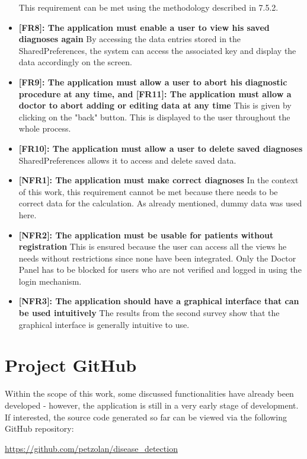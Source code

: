 \begin{itemize}
	\newline
	This requirement can be met using the methodology described in 7.5.2.
	\item \textbf{[FR8]: The application must enable a user to view his saved diagnoses again}
	\newline
	By accessing the data entries stored in the SharedPreferences, the system can access the associated key and display the data accordingly on the screen.
	\item \textbf{[FR9]: The application must allow a user to abort his diagnostic procedure at any time, and [FR11]: The application must allow a doctor to abort adding or editing data at any time}
	\newline
	This is given by clicking on the "back" button. This is displayed to the user throughout the whole process.
	\item \textbf{[FR10]: The application must allow a user to delete saved diagnoses}
	\newline
	SharedPreferences allows it to access and delete saved data.
	\item \textbf{[NFR1]: The application must make correct diagnoses}
	\newline
	In the context of this work, this requirement cannot be met because there needs to be correct data for the calculation. As already mentioned, dummy data was used here.
	\item \textbf{[NFR2]: The application must be usable for patients without registration}
	\newline
	This is ensured because the user can access all the views he needs without restrictions since none have been integrated. Only the Doctor Panel has to be blocked for users who are not verified and logged in using the login mechanism.
	\item \textbf{[NFR3]: The application should have a graphical interface that can be used intuitively}
	\newline
	The results from the second survey show that the graphical interface is generally intuitive to use.
\end{itemize}
\section{Project GitHub}
Within the scope of this work, some discussed functionalities have already been developed - however, the application is still in a very early stage of development. If interested, the source code generated so far can be viewed via the following GitHub repository:
\begin{center}
\url{https://github.com/petzolan/disease_detection}
\end{center}



